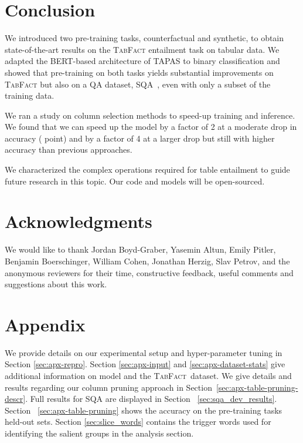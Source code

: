\documentclass[11pt,a4paper]{article}
\newcommand{\sqa}{\textsc{SQA}\xspace}
\newcommand{\tabfact}{\textsc{TabFact}\xspace}
\newcommand\sota{state-of-the-art\xspace}
\newcommand{\tapas}{\textsc{TAPAS}\xspace}
\newcommand{\bert}{\textsc{BERT}\xspace}
\theoremstyle{definition}
\begin{document}
 \section{Conclusion}
\label{sec:conclusion}

We introduced two pre-training tasks, counterfactual and synthetic, to obtain \sota results on the \tabfact\cite{2019TabFactA} entailment task on tabular data.
We adapted the \bert-based architecture of \tapas\cite{herzig-2020} to binary classification and showed that pre-training on both tasks yields substantial improvements on \tabfact but also on a QA dataset, \sqa~\cite{iyyer-etal-2017-search}, even with only a subset of the training data. 

We ran a study on column selection methods to speed-up training and inference.
We found that we can speed up the model by a factor of 2 at a moderate drop in accuracy ( point)
and by a factor of 4 at a larger drop but still with higher accuracy than previous approaches.

We characterized the complex operations required for table entailment to guide future research in this topic.
Our code and models will be open-sourced.

\section*{Acknowledgments}
We would like to thank Jordan Boyd-Graber, Yasemin Altun, Emily Pitler, Benjamin Boerschinger, William Cohen, Jonathan Herzig, Slav Petrov, and
the anonymous reviewers for their time, constructive
feedback, useful comments and suggestions about this work.  



\clearpage

\appendix\section*{Appendix}



We provide details on our experimental setup and hyper-parameter tuning in Section \ref{sec:apx-repro}.
Section \ref{sec:apx-input} and \ref{sec:apx-dataset-stats} give additional information on model and the \tabfact{}~dataset.
We give details and results regarding our column pruning approach in Section~\ref{sec:apx-table-pruning-descr}.
Full results for \sqa are displayed in Section ~\ref{sec:sqa_dev_results}. Section ~\ref{sec:apx-table-pruning} shows the accuracy on the pre-training tasks held-out sets.
Section \ref{sec:slice_words} contains the trigger words used for identifying the salient groups in the analysis section.
\end{document}
